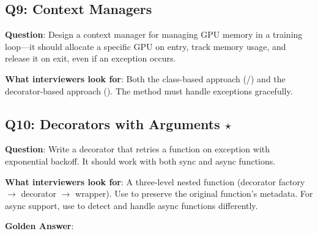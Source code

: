 \subsection{Q9: Context Managers}

\textbf{Question}: Design a context manager for managing GPU memory in a training loop---it should allocate a specific GPU on entry, track memory usage, and release it on exit, even if an exception occurs.

\textbf{What interviewers look for}: Both the class-based approach (/) and the decorator-based approach (). The  method must handle exceptions gracefully.

\subsection{Q10: Decorators with Arguments $\star$}

\textbf{Question}: Write a decorator  that retries a function on exception with exponential backoff. It should work with both sync and async functions.

\textbf{What interviewers look for}: A three-level nested function (decorator factory $\to$ decorator $\to$ wrapper). Use  to preserve the original function's metadata. For async support, use  to detect and handle async functions differently.

\textbf{Golden Answer}:

